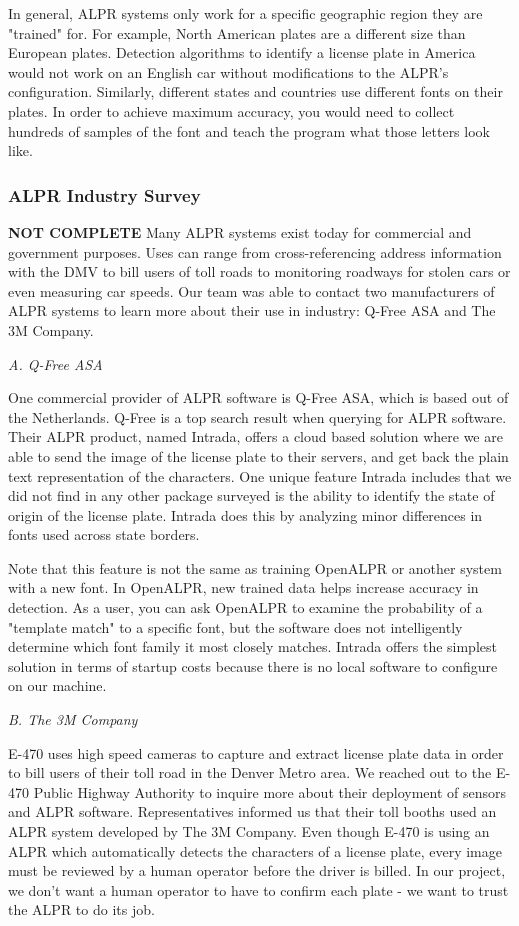 \documentclass[11pt, oneside, fullpage, doublespace]{article}
\begin{document}
In general, ALPR systems only work for a specific geographic region they are "trained" for. For example, North American plates are a different size than European plates. Detection algorithms to identify a license plate in America would not work on an English car without modifications to the ALPR's configuration. Similarly, different states and countries use different fonts on their plates. In order to achieve maximum accuracy, you would need to collect hundreds of samples of the font and teach the program what those letters look like.


\subsubsection{ALPR Industry Survey}
{\color{red}\textbf{NOT COMPLETE}}
Many ALPR systems exist today for commercial and government purposes. Uses can range from cross-referencing address information with the DMV to bill users of toll roads to monitoring roadways for stolen cars or even measuring car speeds. Our team was able to contact two manufacturers of ALPR systems to learn more about their use in industry: Q-Free ASA and The 3M Company.

\emph{A. Q-Free ASA}

One commercial provider of ALPR software is Q-Free ASA, which is based out of the Netherlands. Q-Free is a top search result when querying for ALPR software. Their ALPR product, named Intrada, offers a cloud based solution where we are able to send the image of the license plate to their servers, and get back the plain text representation of the characters. One unique feature Intrada includes that we did not find in any other package surveyed is the ability to identify the state of origin of the license plate. Intrada does this by analyzing minor differences in fonts used across state borders.

Note that this feature is not the same as training OpenALPR or another system with a new font. In OpenALPR, new trained data helps increase accuracy in detection. As a user, you can ask OpenALPR to examine the probability of a "template match" to a specific font, but the software does not intelligently determine which font family it most closely matches. Intrada offers the simplest solution in terms of startup costs because there is no local software to configure on our machine.

\emph{B. The 3M Company}

E-470 uses high speed cameras to capture and extract license plate data in order to bill users of their toll road in the Denver Metro area. We reached out to the E-470 Public Highway Authority to inquire more about their deployment of sensors and ALPR software. Representatives informed us that their toll booths used an ALPR system developed by The 3M Company. Even though E-470 is using an ALPR which automatically detects the characters of a license plate, every image must be reviewed by a human operator before the driver is billed. In our project, we don't want a human operator to have to confirm each plate - we want to trust the ALPR to do its job.
\end{document}
